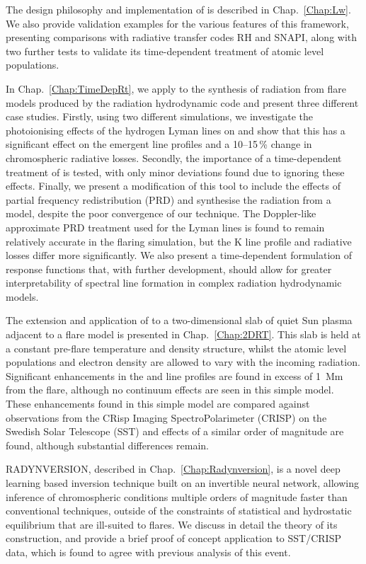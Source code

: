 The design philosophy and implementation of \Lw{} is described in Chap.~\ref{Chap:Lw}.
We also provide validation examples for the various features of this framework, presenting comparisons with \Sota{} radiative transfer codes RH and SNAPI, along with two further tests to validate its time-dependent treatment of atomic level populations.

In Chap.~\ref{Chap:TimeDepRt}, we apply \Lw{} to the synthesis of radiation from flare models produced by the radiation hydrodynamic code \Radyn{} and present three different case studies.
Firstly, using two different \Radyn{} simulations, we investigate the photoionising effects of the hydrogen Lyman lines on \Caii{} and show that this has a significant effect on the emergent line profiles and a 10--15\,\% change in chromospheric radiative losses.
Secondly, the importance of a time-dependent treatment of \Caii{} is tested, with only minor deviations found due to ignoring these effects.
Finally, we present a modification of this tool to include the effects of partial frequency redistribution (PRD) and synthesise the radiation from a \Radyn{} model, despite the poor convergence of our technique.
The Doppler-like approximate PRD treatment used for the Lyman lines is found to remain relatively accurate in the flaring simulation, but the \Caii{} K line profile and radiative losses differ more significantly.
We also present a time-dependent formulation of response functions that, with further development, should allow for greater interpretability of spectral line formation in complex radiation hydrodynamic models.

The extension and application of \Lw{} to a two-dimensional slab of quiet Sun plasma adjacent to a \Radyn{} flare model is presented in Chap.~\ref{Chap:2DRT}.
This slab is held at a constant pre-flare temperature and density structure, whilst the atomic level populations and electron density are allowed to vary with the incoming radiation.
Significant enhancements in the \Ha{} and \CaLine{} line profiles are found in excess of \SI{1}{\mega\m} from the flare, although no continuum effects are seen in this simple model.
These enhancements found in this simple model are compared against observations from the CRisp Imaging SpectroPolarimeter (CRISP) on the Swedish Solar Telescope (SST) and effects of a similar order of magnitude are found, although substantial differences remain.

RADYNVERSION, described in Chap.~\ref{Chap:Radynversion}, is a novel deep learning based inversion technique built on an invertible neural network, allowing inference of chromospheric conditions multiple orders of magnitude faster than conventional techniques, outside of the constraints of statistical and hydrostatic equilibrium that are ill-suited to flares.
We discuss in detail the theory of its construction, and provide a brief proof of concept application to SST/CRISP data, which is found to agree with previous analysis of this event.